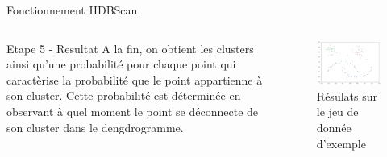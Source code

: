 \begin{frame}{Fonctionnement HDBScan }
    \begin{columns}
        \begin{column}{0.55\textwidth}
            \begin{block}{Etape 5 - Resultat}
                    A la fin, on obtient les clusters ainsi qu'une probabilité pour chaque point qui caractèrise la probabilité que le point appartienne à son cluster. Cette probabilité est déterminée en observant à quel moment le point se déconnecte de son cluster dans le dengdrogramme.
            \end{block}
        \end{column}
        \begin{column}{0.45\textwidth}
            \begin{figure}
                \includegraphics[height=0.4\paperheight]{images/Illustration-HDBScan-6.png}
                \caption{\label{fig:ill_HDBScan_6} Résulats sur le jeu de donnée d'exemple}
            \end{figure}
        \end{column}
    \end{columns}
\end{frame}


